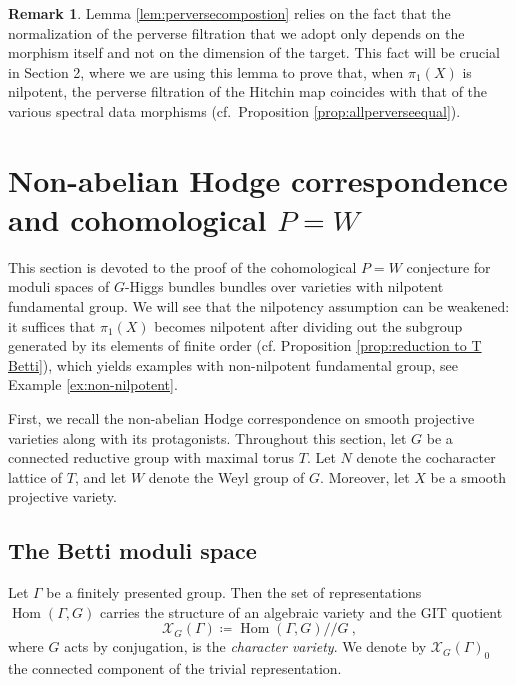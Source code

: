 \documentclass[11pt, a4paper]{amsart}
\theoremstyle{definition}
\newtheorem{remark}[theorem]{Remark}
\theoremstyle{myitemstyle}
\newcommand{\mc}[1]{{\mathcal{#1}}}
\DeclareMathOperator{\Hom}{Hom}
\begin{document}
\begin{remark}\label{rem:pervdimconv}
Lemma \ref{lem:perversecompostion} relies on the fact that the normalization of the perverse filtration that we adopt only depends on the morphism itself and not on the dimension of the target. This fact will be crucial in Section 2, where we are using this lemma to prove that, when $\pi_1(X)$ is nilpotent, the perverse filtration of the Hitchin map coincides with that of the various spectral data morphisms (cf.\  Proposition \ref{prop:allperverseequal}).
\end{remark}

\section{Non-abelian Hodge correspondence and cohomological $P=W$}\label{sec:NAH}

This section is devoted to the proof of the cohomological  $P=W$ conjecture for moduli spaces of $G$-Higgs bundles bundles over varieties with nilpotent fundamental group. 
We will see that the nilpotency assumption can be weakened: it suffices that $\pi_1(X)$ becomes nilpotent after dividing out the subgroup generated by its elements of finite order (cf. Proposition \ref{prop:reduction to T Betti}), which yields examples with non-nilpotent fundamental group, see Example \ref{ex:non-nilpotent}.

First, we recall the non-abelian Hodge correspondence on smooth projective varieties \cite{Simpson_nonabelianHodge} along with its protagonists.  Throughout this section, let $G$ be a connected reductive group with maximal torus $T$. Let $N$ denote the cocharacter lattice of $T$, and let $W$ denote the Weyl group of $G$. Moreover, let $X$ be a smooth projective  variety.

\subsection{The Betti moduli space}

Let $\Gamma$ be a finitely presented group. Then the set of representations $\Hom(\Gamma,G)$ carries the structure of an algebraic variety and the GIT quotient 
\[
\mc X_G(\Gamma)\coloneqq \Hom(\Gamma,G)/\!\!/ G\ ,
\]
where $G$ acts by conjugation, is the \emph{character variety}. We denote by $\mc X_G(\Gamma)_0$ the connected component of the trivial representation. 
\end{document}
